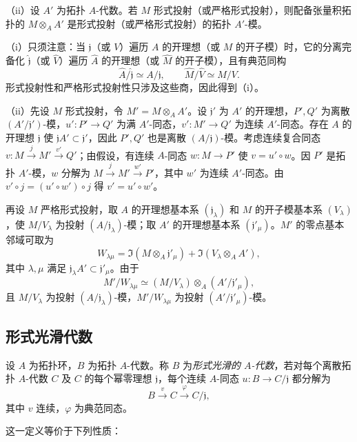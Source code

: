 （ii）设 $A'$ 为拓扑 $A$-代数。若 $M$ 形式投射（或严格形式投射），则配备张量积拓扑的 $M\otimes_AA'$ 是形式投射（或严格形式投射）的拓扑 $A'$-模。

（i）只须注意：当 $\mathfrak j$（或 $V$）遍历 $A$ 的开理想（或 $M$ 的开子模）时，它的分离完备化 $\widehat{\mathfrak j}$（或 $\widehat V$）遍历 $\widehat A$ 的开理想（或 $\widehat M$ 的开子模），且有典范同构
\[
 \widehat A/\widehat{\mathfrak j}\simeq A/\mathfrak j,
 \qquad \widehat M/\widehat V\simeq M/V.
\]
形式投射性和严格形式投射性只涉及这些商，因此得到（i）。

（ii）先设 $M$ 形式投射，令 $M'=M\otimes_AA'$。设 $\mathfrak j'$ 为 $A'$ 的开理想，$P',Q'$ 为离散 $(A'/\mathfrak j')$-模，$u':P'\to Q'$ 为满 $A'$-同态，$v':M'\to Q'$ 为连续 $A'$-同态。存在 $A$ 的开理想 $\mathfrak j$ 使 $\mathfrak jA'\subset\mathfrak j'$，因此 $P',Q'$ 也是离散 $(A/\mathfrak j)$-模。考虑连续复合同态 $v:M\xrightarrow{j}M'\xrightarrow{v'}Q'$；由假设，有连续 $A$-同态 $w:M\to P'$ 使 $v=u'\circ w$。因 $P'$ 是拓扑 $A'$-模，$w$ 分解为 $M\xrightarrow{j}M'\xrightarrow{w'}P'$，其中 $w'$ 为连续 $A'$-同态。由 $v'\circ j=(u'\circ w')\circ j$ 得 $v'=u'\circ w'$。

再设 $M$ 严格形式投射，取 $A$ 的开理想基本系 $(\mathfrak j_\lambda)$ 和 $M$ 的开子模基本系 $(V_\lambda)$，使 $M/V_\lambda$ 为投射 $(A/\mathfrak j_\lambda)$-模；取 $A'$ 的开理想基本系 $(\mathfrak j'_{\mu})$。$M'$ 的零点基本邻域可取为
\[
 W_{\lambda\mu}=
 \Im(M\otimes_A\mathfrak j'_\mu)+\Im(V_\lambda\otimes_AA'),
\]
其中 $\lambda,\mu$ 满足 $\mathfrak j_\lambda A'\subset\mathfrak j'_\mu$。由于
\[
 M'/W_{\lambda\mu}\simeq(M/V_\lambda)\otimes_A(A'/\mathfrak j'_\mu),
\]
且 $M/V_\lambda$ 为投射 $(A/\mathfrak j_\lambda)$-模，$M'/W_{\lambda\mu}$ 为投射 $(A'/\mathfrak j'_\mu)$-模。

\subsection{形式光滑代数}
设 $A$ 为拓扑环，$B$ 为拓扑 $A$-代数。称 $B$ 为\emph{形式光滑的 $A$-代数}，若对每个离散拓扑 $A$-代数 $C$ 及 $C$ 的每个幂零理想 $\mathfrak j$，每个连续 $A$-同态 $u:B\to C/\mathfrak j$ 都分解为
\[
 B\xrightarrow{v}C\xrightarrow{\varphi}C/\mathfrak j,
\]
其中 $v$ 连续，$\varphi$ 为典范同态。

这一定义等价于下列性质：

